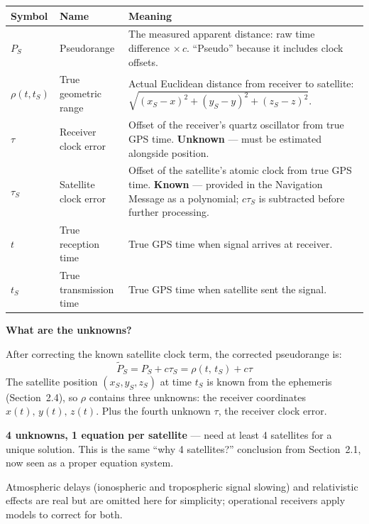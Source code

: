 \documentclass[12pt, a4paper]{article}
\begin{document}
\begin{center}
\begin{tabular}{@{} l p{2.8cm} p{8.2cm} @{}}
  \toprule
  Symbol & Name & Meaning \\
  \midrule
  $P_S$ & Pseudorange &
    The measured apparent distance: raw time difference $\times\,c$.
    ``Pseudo'' because it includes clock offsets. \\
  $\rho(t,t_S)$ & True geometric range &
    Actual Euclidean distance from receiver to satellite:
    $\sqrt{(x_S{-}x)^2 + (y_S{-}y)^2 + (z_S{-}z)^2}$. \\
  $\tau$ & Receiver clock error &
    Offset of the receiver's quartz oscillator from true GPS time.
    \textbf{Unknown} --- must be estimated alongside position. \\
  $\tau_S$ & Satellite clock error &
    Offset of the satellite's atomic clock from true GPS time.
    \textbf{Known} --- provided in the Navigation Message as a polynomial;
    $c\tau_S$ is subtracted before further processing. \\
  $t$ & True reception time & True GPS time when signal arrives at receiver. \\
  $t_S$ & True transmission time & True GPS time when satellite sent the signal. \\
  \bottomrule
\end{tabular}
\end{center}

\begin{notebox}
  \textbf{What are the unknowns?}

  After correcting the known satellite clock term, the corrected pseudorange is:
  \[
    \tilde{P}_S = P_S + c\tau_S = \rho(t,\,t_S) + c\tau
  \]
  The satellite position $(x_S, y_S, z_S)$ at time $t_S$ is known from the
  ephemeris (Section~2.4), so $\rho$ contains three unknowns: the receiver
  coordinates $x(t),\,y(t),\,z(t)$.
  Plus the fourth unknown $\tau$, the receiver clock error.

  \textbf{4 unknowns, 1 equation per satellite} --- need at least 4 satellites
  for a unique solution.
  This is the same ``why 4 satellites?'' conclusion from Section~2.1, now
  seen as a proper equation system.

  Atmospheric delays (ionospheric and tropospheric signal slowing) and
  relativistic effects are real but are omitted here for simplicity;
  operational receivers apply models to correct for both.
\end{notebox}
\end{document}

